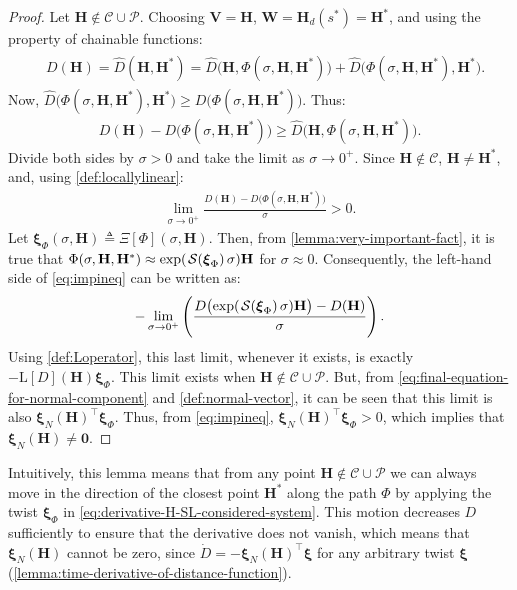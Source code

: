 \begin{proof}
    Let $\mathbf{H} \notin \mathcal{C} \cup \mathcal{P}$. Choosing $\mathbf{V} = \mathbf{H}$, $\mathbf{W} = \mathbf{H}_d(s^*) = \mathbf{H}^*$, and using the property of chainable functions:
    \begin{align}        
        \begin{split}
            & D(\mathbf{H}) = \widehat{D}(\mathbf{H},\mathbf{H}^*) = \widehat{D}\bigl(\mathbf{H},\Phi(\sigma,\mathbf{H},\mathbf{H}^*)\bigr){+} \widehat{D}\bigl(\Phi(\sigma,\mathbf{H},\mathbf{H}^*),\mathbf{H}^*\bigr).        
        \end{split}
    \end{align}
Now, $\widehat{D}\bigl(\Phi(\sigma,\mathbf{H},\mathbf{H}^*),\mathbf{H}^*\bigr) \geq D\bigl(\Phi(\sigma,\mathbf{H},\mathbf{H}^*)\bigr)$. Thus:
\begin{align}
    D(\mathbf{H})-D\bigl(\Phi(\sigma,\mathbf{H},\mathbf{H}^*)\bigr) \geq \widehat{D}\bigl(\mathbf{H},\Phi(\sigma,\mathbf{H},\mathbf{H}^*)\bigr).
\end{align}
Divide both sides by $\sigma >0$ and take the limit as $\sigma \rightarrow 0^+$. Since $\mathbf{H} \not \in \mathcal{C}$, $\mathbf{H} \not = \mathbf{H}^*$, and, using \cref{def:locallylinear}:
\begin{align}
\label{eq:impineq}
 \lim_{\sigma \rightarrow 0^+} \frac{D(\mathbf{H})-D\bigl(\Phi(\sigma,\mathbf{H},\mathbf{H}^*)\bigr)}{\sigma} > 0.   
\end{align}
Let $\boldsymbol{\xi}_\Phi(\sigma,\mathbf{H}) \triangleq \Xi[\Phi](\sigma,\mathbf{H})$. Then, from \cref{lemma:very-important-fact}, it is true that $\Phi(\sigma,\mathbf{H},\mathbf{H}^*) \approx \exp(\SL[\boldsymbol{\xi}_\Phi]\sigma)\mathbf{H}$ for $\sigma \approx 0$. Consequently, the left-hand side of \eqref{eq:impineq} can be written as:
\begin{equation}
\label{eq:impineq2}
  -\lim_{\sigma \rightarrow 0^+} \left( \frac{D\bigl(\exp(\SL[\boldsymbol{\xi}_\Phi]\sigma)\mathbf{H}\bigr) - D(\mathbf{H})}{\sigma} \right).
\end{equation}
Using \cref{def:Loperator}, this last limit, whenever it exists, is exactly $-\text{L}[D](\mathbf{H}) \boldsymbol{\xi}_\Phi$. This limit exists when $\mathbf{H} \not \in \mathcal{C} \cup \mathcal{P}$. But, from \eqref{eq:final-equation-for-normal-component} and \cref{def:normal-vector}, it can be seen that this limit is also $\boldsymbol{\xi}_N(\mathbf{H})^\top \boldsymbol{\xi}_\Phi$. Thus, from  \eqref{eq:impineq}, $\boldsymbol{\xi}_N(\mathbf{H})^\top \boldsymbol{\xi}_\Phi > 0$,  which implies that $\boldsymbol{\xi}_N(\mathbf{H}) \not= \mathbf{0}$. 
\end{proof}
Intuitively, this lemma means that from any point $\mathbf{H} \notin \mathcal{C} \cup \mathcal{P}$ we can always move in the direction of the closest point $\mathbf{H}^*$ along the path $\Phi$ by applying the twist $\boldsymbol{\xi}_\Phi$ in \eqref{eq:derivative-H-SL-considered-system}. This motion decreases $D$ sufficiently to ensure that the derivative does not vanish, which means that $\boldsymbol{\xi}_N(\mathbf{H})$ cannot be zero, since $\dot{D} = -\boldsymbol{\xi}_N(\mathbf{H})^{\top} \boldsymbol{\xi}$ for any arbitrary twist $\boldsymbol{\xi}$ (\cref{lemma:time-derivative-of-distance-function}).
